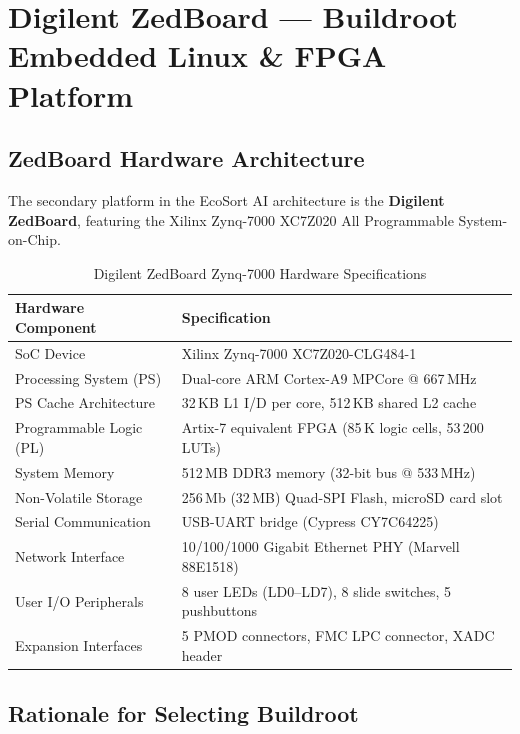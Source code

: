 \documentclass[12pt,a4paper]{article}
\begin{document}
\clearpage

\section{Digilent ZedBoard — Buildroot Embedded Linux \& FPGA Platform}

\subsection{ZedBoard Hardware Architecture}

The secondary platform in the EcoSort AI architecture is the \textbf{Digilent ZedBoard},
featuring the Xilinx Zynq-7000 XC7Z020 All Programmable System-on-Chip.

\begin{table}[H]
\centering
\caption{Digilent ZedBoard Zynq-7000 Hardware Specifications}\label{tab:zedboard_specs}
\begin{tabular}{ll}
\toprule
\textbf{Hardware Component} & \textbf{Specification} \\
\midrule
SoC Device             & Xilinx Zynq-7000 XC7Z020-CLG484-1 \\
Processing System (PS) & Dual-core ARM Cortex-A9 MPCore @ 667\,MHz \\
PS Cache Architecture  & 32\,KB L1 I/D per core, 512\,KB shared L2 cache \\
Programmable Logic (PL)& Artix-7 equivalent FPGA (85\,K logic cells, 53\,200 LUTs) \\
System Memory          & 512\,MB DDR3 memory (32-bit bus @ 533\,MHz) \\
Non-Volatile Storage   & 256\,Mb (32\,MB) Quad-SPI Flash, microSD card slot \\
Serial Communication   & USB-UART bridge (Cypress CY7C64225) \\
Network Interface      & 10/100/1000 Gigabit Ethernet PHY (Marvell 88E1518) \\
User I/O Peripherals   & 8 user LEDs (LD0--LD7), 8 slide switches, 5 pushbuttons \\
Expansion Interfaces   & 5 PMOD connectors, FMC LPC connector, XADC header \\
\bottomrule
\end{tabular}
\end{table}

\subsection{Rationale for Selecting Buildroot}
\end{document}
